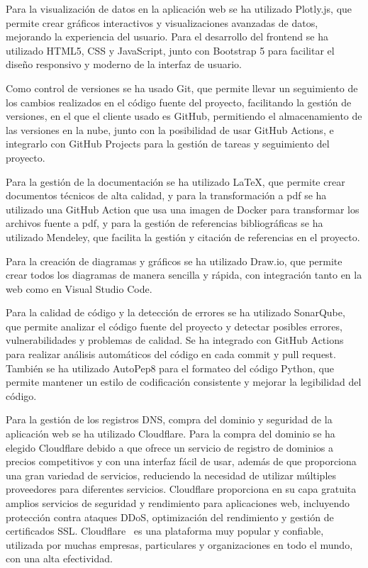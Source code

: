 Para la visualización de datos en la aplicación web se ha utilizado Plotly.js, que permite crear gráficos interactivos y visualizaciones avanzadas de datos, mejorando la experiencia del usuario. Para el desarrollo del frontend se ha utilizado HTML5, CSS y JavaScript, junto con Bootstrap 5 para facilitar el diseño responsivo y moderno de la interfaz de usuario.

Como control de versiones se ha usado Git, que permite llevar un seguimiento de los cambios realizados en el código fuente del proyecto, facilitando la gestión de versiones, en el que el cliente usado es GitHub, permitiendo el almacenamiento de las versiones en la nube, junto con la posibilidad de usar GitHub Actions, e integrarlo con GitHub Projects para la gestión de tareas y seguimiento del proyecto. 

Para la gestión de la documentación se ha utilizado LaTeX, que permite crear documentos técnicos de alta calidad, y para la transformación a pdf se ha utilizado una GitHub Action que usa una imagen de Docker para transformar los archivos fuente a pdf, y para la gestión de referencias bibliográficas se ha utilizado Mendeley, que facilita la gestión y citación de referencias en el proyecto.

Para la creación de diagramas y gráficos se ha utilizado Draw.io, que permite crear todos los diagramas de manera sencilla y rápida, con integración tanto en la web como en Visual Studio Code.

Para la calidad de código y la detección de errores se ha utilizado SonarQube, que permite analizar el código fuente del proyecto y detectar posibles errores, vulnerabilidades y problemas de calidad. Se ha integrado con GitHub Actions para realizar análisis automáticos del código en cada commit y pull request. También se ha utilizado AutoPep8 para el formateo del código Python, que permite mantener un estilo de codificación consistente y mejorar la legibilidad del código.

Para la gestión de los registros DNS, compra del dominio y seguridad de la aplicación web se ha utilizado Cloudflare. Para la compra del dominio se ha elegido Cloudflare debido a que ofrece un servicio de registro de dominios a precios competitivos y con una interfaz fácil de usar, además de que proporciona una gran variedad de servicios, reduciendo la necesidad de utilizar múltiples proveedores para diferentes servicios. Cloudflare proporciona en su capa gratuita amplios servicios de seguridad y rendimiento para aplicaciones web, incluyendo protección contra ataques DDoS, optimización del rendimiento y gestión de certificados SSL. Cloudflare~\cite{Nadeem2023,Adhar2023} es una plataforma muy popular y confiable, utilizada por muchas empresas, particulares y organizaciones en todo el mundo, con una alta efectividad. 


